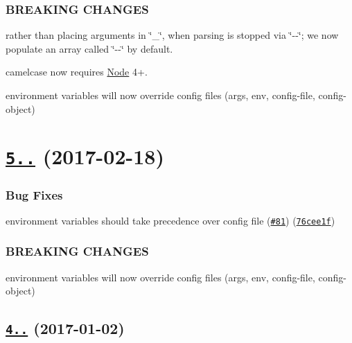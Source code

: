 \subsubsection*{B\+R\+E\+A\+K\+I\+NG C\+H\+A\+N\+G\+ES}


\begin{DoxyItemize}
\item rather than placing arguments in \char`\"{}\+\_\+\char`\"{}, when parsing is stopped via \char`\"{}-\/-\/\char`\"{}; we now populate an array called \char`\"{}-\/-\/\char`\"{} by default.
\item camelcase now requires \mbox{\hyperlink{classNode}{Node}} 4+.
\item environment variables will now override config files (args, env, config-\/file, config-\/object)
\end{DoxyItemize}

\label{_5.0.0}%
 \section*{\href{https://github.com/yargs/yargs-parser/compare/v4.2.1...v5.0.0}{\tt 5..} (2017-\/02-\/18)}

\subsubsection*{Bug Fixes}


\begin{DoxyItemize}
\item environment variables should take precedence over config file (\href{https://github.com/yargs/yargs-parser/issues/81}{\tt \#81}) (\href{https://github.com/yargs/yargs-parser/commit/76cee1f}{\tt 76cee1f})
\end{DoxyItemize}

\subsubsection*{B\+R\+E\+A\+K\+I\+NG C\+H\+A\+N\+G\+ES}


\begin{DoxyItemize}
\item environment variables will now override config files (args, env, config-\/file, config-\/object)
\end{DoxyItemize}

\label{_4.2.1}%
 \subsection*{\href{https://github.com/yargs/yargs-parser/compare/v4.2.0...v4.2.1}{\tt 4..} (2017-\/01-\/02)}

